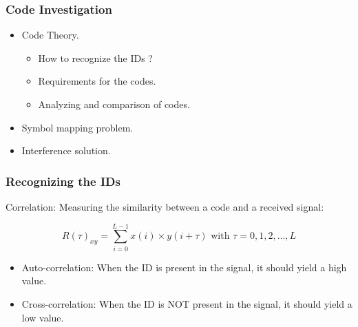 \documentclass{beamer}
\begin{document}
	\begin{frame}\frametitle{Code Investigation}

		\begin{itemize}

			\item Code Theory.
			\begin{itemize}

				\item How to recognize the IDs ?

				\item Requirements for the codes.

				\item Analyzing and comparison of codes.
			\end{itemize}

			\item Symbol mapping problem.

			\item Interference solution.

		\end{itemize}

	\end{frame}

	




	\begin{frame}\frametitle{Recognizing the IDs}
		
		Correlation: Measuring the similarity between a code and a received signal:

		\begin{equation*}
			R(\tau)_{xy} = \displaystyle\sum_{i = 0} ^ {L - 1} x(i) \times y(i + \tau) {\text{  with $\tau = 0, 1, 2, \dotsc, L$}}
		\end{equation*}

		\begin{itemize}

			\item Auto-correlation: When the ID is present in the signal, it should yield a high value.

			\item Cross-correlation: When the ID is NOT present in the signal, it should yield a low value.

		\end{itemize}
	\end{frame}
\end{document}
